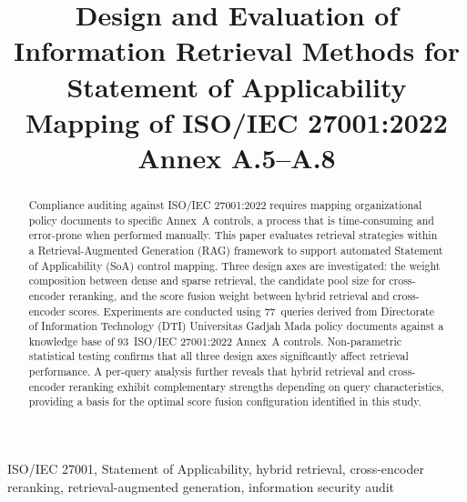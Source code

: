\documentclass[conference]{IEEEtran}
\begin{document}
\title{Design and Evaluation of Information Retrieval Methods for Statement of Applicability Mapping of ISO/IEC 27001:2022 Annex A.5--A.8}

\author{
  \and
}

\maketitle

\begin{abstract}
Compliance auditing against ISO/IEC 27001:2022 requires mapping organizational
policy documents to specific Annex~A controls, a process that is time-consuming
and error-prone when performed manually. This paper evaluates retrieval
strategies within a Retrieval-Augmented Generation (RAG) framework to support
automated Statement of Applicability (SoA) control mapping. Three design axes
are investigated: the weight composition between dense and sparse retrieval,
the candidate pool size for cross-encoder reranking, and the score fusion
weight between hybrid retrieval and cross-encoder scores. Experiments are
conducted using 77~queries derived from Directorate of Information Technology
(DTI) Universitas Gadjah Mada policy documents against a knowledge base of
93~ISO/IEC 27001:2022 Annex~A controls. Non-parametric statistical testing
confirms that all three design axes significantly affect retrieval performance.
A per-query analysis further reveals that hybrid retrieval and cross-encoder
reranking exhibit complementary strengths depending on query characteristics,
providing a basis for the optimal score fusion configuration identified in
this study.
\end{abstract}

\begin{IEEEkeywords}
ISO/IEC 27001, Statement of Applicability, hybrid retrieval, cross-encoder
reranking, retrieval-augmented generation, information security audit
\end{IEEEkeywords}
\end{document}
